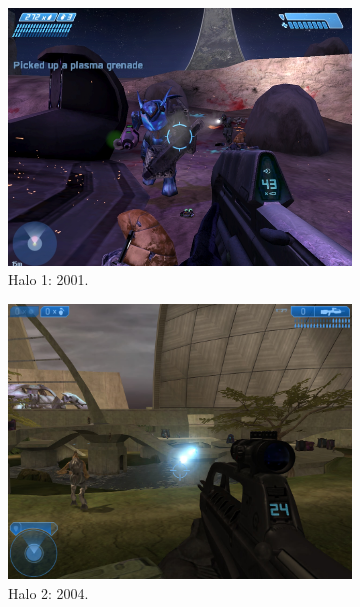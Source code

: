\begin{figure}[t]
  \centering
  \begin{subfigure}[b]{0.266\textwidth}
    \includegraphics[width=\textwidth]{./img/raw/intro-halo/halo_1.png}
    \caption{Halo 1: 2001.}
    \label{fig:intro-halo:1}
  \end{subfigure} \quad
  \begin{subfigure}[b]{0.25\textwidth}
    \includegraphics[width=\textwidth]{./img/raw/intro-halo/halo_2.png}
    \caption{Halo 2: 2004.}
    \label{fig:intro-halo:2}
  \end{subfigure} \quad
  \begin{subfigure}[b]{0.356\textwidth}

\end{subfigure}
\end{figure}
